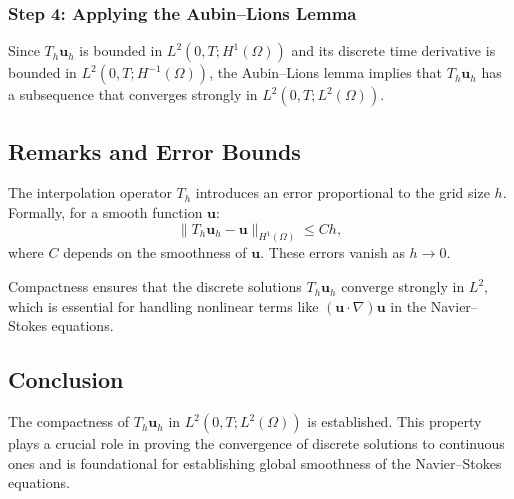 \subsubsection{Step 4: Applying the Aubin--Lions Lemma}

Since $T_h \mathbf{u}_h$ is bounded in $L^2(0,T; H^1(\Omega))$ and its discrete time derivative is bounded in $L^2(0,T; H^{-1}(\Omega))$, the Aubin--Lions lemma implies that $T_h \mathbf{u}_h$ has a subsequence that converges strongly in $L^2(0,T; L^2(\Omega))$.

\subsection{Remarks and Error Bounds}

\begin{remark}
The interpolation operator $T_h$ introduces an error proportional to the grid size $h$. Formally, for a smooth function $\mathbf{u}$:
\begin{equation}
\|T_h \mathbf{u}_h - \mathbf{u}\|_{H^1(\Omega)} \leq Ch,
\end{equation}
where $C$ depends on the smoothness of $\mathbf{u}$. These errors vanish as $h \to 0$.
\end{remark}

\begin{remark}
Compactness ensures that the discrete solutions $T_h \mathbf{u}_h$ converge strongly in $L^2$, which is essential for handling nonlinear terms like $(\mathbf{u} \cdot \nabla) \mathbf{u}$ in the Navier--Stokes equations.
\end{remark}

\subsection{Conclusion}

The compactness of $T_h \mathbf{u}_h$ in $L^2(0,T; L^2(\Omega))$ is established. This property plays a crucial role in proving the convergence of discrete solutions to continuous ones and is foundational for establishing global smoothness of the Navier--Stokes equations.

